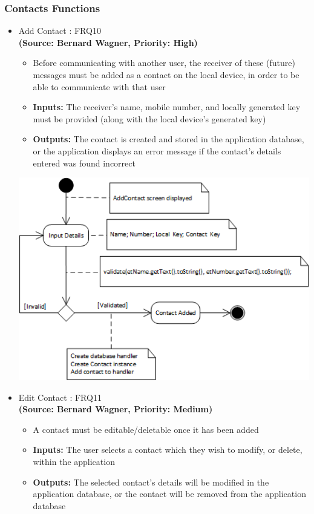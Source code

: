 \subsubsection{Contacts Functions}
\begin{itemize}
\item{Add Contact : FRQ10}\\
\textbf{(Source: Bernard Wagner, Priority: High)}
\begin{itemize}
\item Before communicating with another user, the receiver of these (future) messages must be added as a contact on the local device, in order to be able to communicate with that user
\item \textbf{Inputs:} The receiver's name, mobile number, and locally generated key must be provided (along with the local device's generated key)
\item \textbf{Outputs:} The contact is created and stored in the application database, or the application displays an error message if the contact's details entered was found incorrect
\end{itemize}
 \includegraphics[width=13cm]{diagrams/StateDiagrams/AddContactStateDiagram.png}
\newpage
\item{Edit Contact : FRQ11}\\
\textbf{(Source: Bernard Wagner, Priority: Medium)}
\begin{itemize}
\item A contact must be editable/deletable once it has been added
\item \textbf{Inputs:} The user selects a contact which they wish to modify, or delete, within the application
\item \textbf{Outputs:} The selected contact's details will be modified in the application database, or the contact will be removed from the application database

\end{itemize}
\end{itemize}
